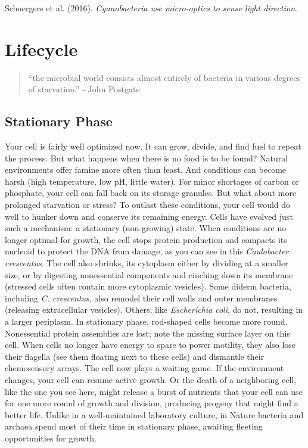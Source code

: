 \documentclass[]{tufte-book}
\begin{document}
Schuergers et al. (2016). \emph{Cyanobacteria use micro-optics to sense
light direction}.\citep{schuergers2016}

\chapter{Lifecycle}\label{lifecycle}

\begin{quote}
``the microbial world consists almost entirely of bacteria in various
degrees of starvation.'' - John Postgate \citep{postgate1994}
\end{quote}

\section{Stationary Phase}\label{stationary-phase}

Your cell is fairly well optimized now. It can grow, divide, and find
fuel to repeat the process. But what happens when there is no food is to
be found? Natural environments offer famine more often than feast. And
conditions can become harsh (high temperature, low pH, little water).
For minor shortages of carbon or phosphate, your cell can fall back on
its storage granules. But what about more prolonged starvation or
stress? To outlast these conditions, your cell would do well to hunker
down and conserve its remaining energy. Cells have evolved just such a
mechanism: a stationary (non-growing) state. When conditions are no
longer optimal for growth, the cell stops protein production and
compacts its nucleoid to protect the DNA from damage, as you can see in
this \emph{Caulobacter crescentus}. The cell also shrinks, its cytoplasm
either by dividing at a smaller size, or by digesting nonessential
components and cinching down its membrane (stressed cells often contain
more cytoplasmic vesicles). Some diderm bacteria, including \emph{C.
crescentus}, also remodel their cell walls and outer membranes
(releasing extracellular vesicles). Others, like \emph{Escherichia
coli}, do not, resulting in a larger periplasm. In stationary phase,
rod-shaped cells become more round. Nonessential protein assemblies are
lost; note the missing surface layer on this cell. When cells no longer
have energy to spare to power motility, they also lose their flagella
(see them floating next to these cells) and dismantle their chemosensory
arrays. The cell now plays a waiting game. If the environment changes,
your cell can resume active growth. Or the death of a neighboring cell,
like the one you see here, might release a burst of nutrients that your
cell can use for one more round of growth and division, producing
progeny that might find a better life. Unlike in a well-maintained
laboratory culture, in Nature bacteria and archaea spend most of their
time in stationary phase, awaiting fleeting opportunities for growth.
\end{document}
